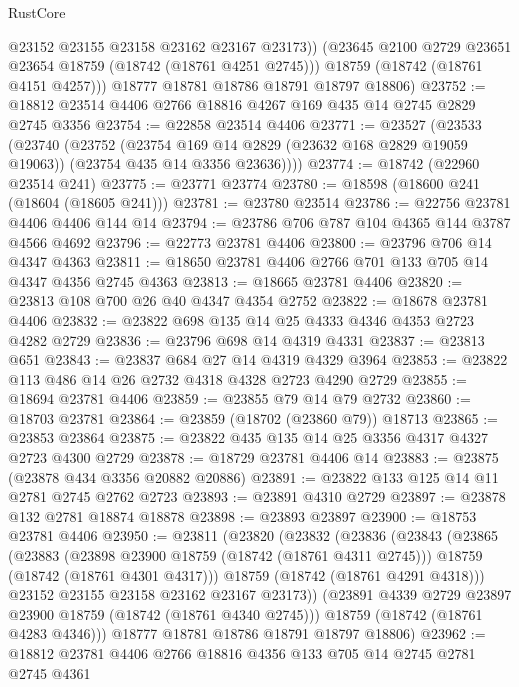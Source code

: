 \begin{lexlean}{RustCore}
\begin{coremodule}
            @23152
            @23155
            @23158
            @23162
            @23167
            @23173))
        (@23645 @2100 @2729 @23651 @23654 @18759 (@18742 (@18761 @4251 @2745)))
        @18759
        (@18742 (@18761 @4151 @4257)))
      @18777
      @18781
      @18786
      @18791
      @18797
      @18806)
@23752 := @18812 @23514 @4406 @2766 @18816 @4267 @169 @435 @14 @2745 @2829 @2745 @3356
@23754 := @22858 @23514 @4406
@23771 := @23527
    (@23533
      (@23740
        (@23752
          (@23754 @169 @14 @2829 (@23632 @168 @2829 @19059 @19063))
          (@23754 @435 @14 @3356 @23636))))
@23774 := @18742 (@22960 @23514 @241)
@23775 := @23771 @23774
@23780 := @18598 (@18600 @241 (@18604 (@18605 @241)))
@23781 := @23780 @23514
@23786 := @22756 @23781 @4406 @4406 @144 @14
@23794 := @23786 @706 @787 @104 @4365 @144 @3787 @4566 @4692
@23796 := @22773 @23781 @4406
@23800 := @23796 @706 @14 @4347 @4363
@23811 := @18650 @23781 @4406 @2766 @701 @133 @705 @14 @4347 @4356 @2745 @4363
@23813 := @18665 @23781 @4406
@23820 := @23813 @108 @700 @26 @40 @4347 @4354 @2752
@23822 := @18678 @23781 @4406
@23832 := @23822 @698 @135 @14 @25 @4333 @4346 @4353 @2723 @4282 @2729
@23836 := @23796 @698 @14 @4319 @4331
@23837 := @23813 @651
@23843 := @23837 @684 @27 @14 @4319 @4329 @3964
@23853 := @23822 @113 @486 @14 @26 @2732 @4318 @4328 @2723 @4290 @2729
@23855 := @18694 @23781 @4406
@23859 := @23855 @79 @14 @79 @2732
@23860 := @18703 @23781
@23864 := @23859 (@18702 (@23860 @79)) @18713
@23865 := @23853 @23864
@23875 := @23822 @435 @135 @14 @25 @3356 @4317 @4327 @2723 @4300 @2729
@23878 := @18729 @23781 @4406 @14
@23883 := @23875 (@23878 @434 @3356 @20882 @20886)
@23891 := @23822 @133 @125 @14 @11 @2781 @2745 @2762 @2723
@23893 := @23891 @4310 @2729
@23897 := @23878 @132 @2781 @18874 @18878
@23898 := @23893 @23897
@23900 := @18753 @23781 @4406
@23950 := @23811
    (@23820
      (@23832
        (@23836
          (@23843
            (@23865
              (@23883
                (@23898 @23900 @18759 (@18742 (@18761 @4311 @2745)))
                @18759
                (@18742 (@18761 @4301 @4317)))
              @18759
              (@18742 (@18761 @4291 @4318)))
            @23152
            @23155
            @23158
            @23162
            @23167
            @23173))
        (@23891 @4339 @2729 @23897 @23900 @18759 (@18742 (@18761 @4340 @2745)))
        @18759
        (@18742 (@18761 @4283 @4346)))
      @18777
      @18781
      @18786
      @18791
      @18797
      @18806)
@23962 := @18812 @23781 @4406 @2766 @18816 @4356 @133 @705 @14 @2745 @2781 @2745 @4361

\end{coremodule}
\end{lexlean}
